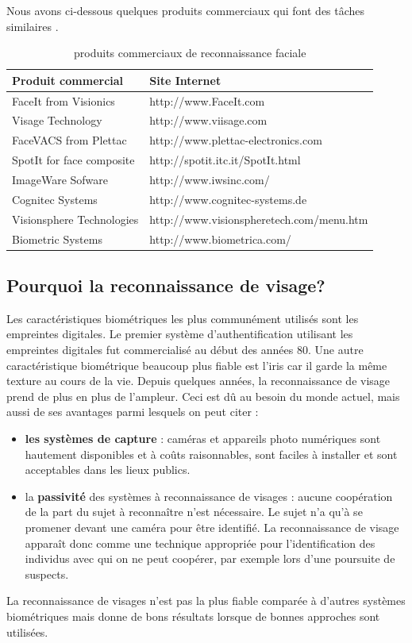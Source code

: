 Nous avons ci-dessous quelques produits commerciaux qui font des tâches similaires \citep{Gur}.
\begin{table}[htbp]
	\centering
		\begin{tabular}{|l|l|}
		\hline	Produit commercial & Site Internet \\ 
		\hline	FaceIt from Visionics & http://www.FaceIt.com\\
		\hline	Visage Technology  &http://www.viisage.com\\
		\hline	FaceVACS from Plettac & http://www.plettac-electronics.com\\
		\hline	SpotIt for face composite & http://spotit.itc.it/SpotIt.html\\
		\hline	ImageWare Sofware & http://www.iwsinc.com/ \\
		\hline	Cognitec Systems & http://www.cognitec-systems.de \\
		\hline	Visionsphere Technologies &  http://www.visionspheretech.com/menu.htm\\
		\hline	Biometric Systems & http://www.biometrica.com/ 	\\
		\hline
		\end{tabular}
	\caption{produits commerciaux de reconnaissance faciale}
	\label{tab:produitsCommerciauxDeReconnaissanceFaciale}
\end{table}
\subsection{Pourquoi la reconnaissance de visage?}
 Les caractéristiques  biométriques les plus communément utilisés sont les empreintes digitales. Le premier système d'authentification utilisant les empreintes digitales	fut commercialisé au début des années 80. Une autre caractéristique biométrique beaucoup plus fiable est l'iris car il garde la même texture au cours de la vie. Depuis quelques années, la reconnaissance de visage prend de plus en plus de l'ampleur. Ceci est dû au besoin du monde actuel, mais aussi de ses avantages parmi lesquels on peut citer : 
\begin{itemize}
	\item \textbf{les systèmes de capture} : caméras et appareils photo numériques sont hautement disponibles et à coûts raisonnables, sont faciles à installer et sont acceptables dans les lieux publics.
	\item la\textbf{ passivité} des systèmes à reconnaissance de visages : aucune coopération de la part du sujet à reconnaître n'est nécessaire. Le sujet n'a qu'à se promener devant une caméra pour être identifié. La reconnaissance de visage apparaît donc comme une technique appropriée pour l'identification des individus avec qui on ne peut coopérer, par exemple lors d'une poursuite de suspects.
\end{itemize}
La reconnaissance de visages n'est pas la plus fiable comparée à d'autres systèmes biométriques \cite{Sou12} mais donne de bons résultats lorsque de bonnes approches sont utilisées.


